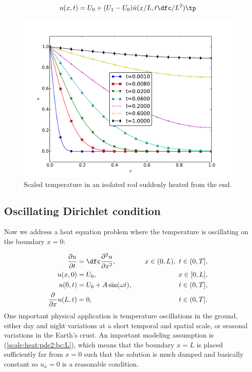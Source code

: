 \documentclass[graybox,envcountchap,sectrefs,final]{svmonodo}
\begin{document}
\[ u(x,t) = U_0 + (U_1-U_0)\bar u(x/L, t\dfc/L^2)\tp\]


\begin{figure}[!ht]  %
  \centerline{\includegraphics[width=0.8\linewidth]{fig-scaling/diffusion_jump_BC.pdf}}
  \caption{
  Scaled temperature in an isolated rod suddenly heated from the end. \label{scale:heat:pde3:fig}
  }
\end{figure}



\subsection{Oscillating Dirichlet condition}

Now we address a heat equation problem where the temperature is
oscillating on the boundary $x=0$:

\begin{align}
\frac{\partial u}{\partial t} &=
\dfc \frac{\partial^2 u}{\partial x^2},
\quad &  x\in (0,L),\ t\in (0, T],
\label{scale:heat:pde2}\\ 
u(x,0) &= U_0,
\quad & x\in [0,L],
\label{scale:heat:pde2:ic:u}\\ 
u(0, t) & = U_0 + A\sin(\omega t),
\quad  & t\in (0, T],
\label{scale:heat:pde2:bc:0}\\ 
\frac{\partial}{\partial x} u(L, t) & = 0,
\quad & t\in (0, T].
\label{scale:heat:pde2:bc:L}
\end{align}
One important physical application is temperature oscillations in the
ground, either day and night variations
at a short temporal and spatial scale, or seasonal variations in the
Earth's crust.
An important modeling assumption is (\ref{scale:heat:pde2:bc:L}),
which means that the boundary $x=L$ is placed sufficiently far from $x=0$
such that the solution is much damped and basically constant so
$u_x=0$ is a reasonable condition.
\end{document}
